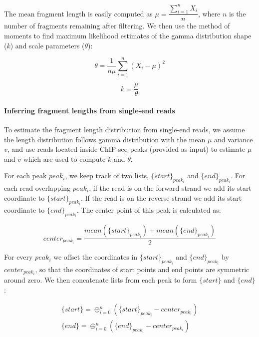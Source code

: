 \documentclass[12pt]{article}
\begin{document}
The mean fragment length is easily computed as $\mu = \dfrac{\sum_{i=1}^{n}X_i}{n}$, where $n$ is the number of fragments remaining after filtering. We then use the method of moments to find maximum likelihood estimates of the gamma distribution shape ($k$) and scale parameters ($\theta$):

\begin{equation}
  \theta = \dfrac{1}{n\mu}\sum_{i=1}^{n}(X_i - \mu)^2
\end{equation}

\begin{equation}
  k =  \dfrac{\mu}{\theta}
\end{equation}

\paragraph{Inferring fragment lengths from single-end reads}
To estimate the fragment length distribution from single-end reads, we assume the length distribution follows gamma distribution with the mean $\mu$ and variance $v$, and use reads located inside ChIP-seq peaks (provided as input) to estimate $\mu$ and $v$ which are used to compute $k$ and $\theta$.

For each peak $peak_i$, we keep track of two lists, $\{start\}_{peak_i}$ and $\{end\}_{peak_i}$.
For each read overlapping $peak_i$, if the read is on the forward strand we add its start coordinate to $\{start\}_{peak_i}$.
If the read is on the reverse strand we add its start coordinate to $\{end\}_{peak_i}$.
The center point of this peak is calculated as:

\begin{equation} \label{eq:center}
  center_{peak_i} = \frac{mean(\{start\}_{peak_i}) + mean(\{end\}_{peak_i})}{2}
\end{equation}
  
For every $peak_i$ we offset the coordinates in $\{start\}_{peak_i}$ and $\{end\}_{peak_i}$ by $center_{peak_i}$, so that the coordinates of start points and end points are symmetric around zero.
We then concatenate lists from each peak to form $\{start\}$ and $\{end\}$:

\begin{equation} \label{eq:concat}
  \begin{array}{c}
  \{start\} = \oplus_{i=0}^{n} (\{start\}_{peak_i} - center_{peak_i})\\
  \{end\} = \oplus_{i=0}^{n} (\{end\}_{peak_i} - center_{peak_i})
  \end{array}
\end{equation}
\end{document}

